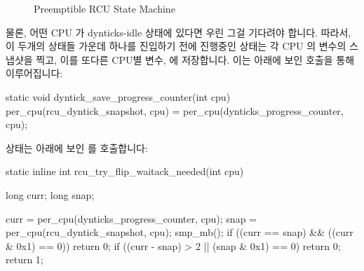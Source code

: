 \fi

\begin{figure}[tb]
\centering
{}
\caption{Preemptible RCU State Machine}
\label{fig:formal:Preemptible RCU State Machine}
\end{figure}

물론, 어떤 CPU 가 dynticks-idle 상태에 있다면 우린 그걸 기다려야 합니다.
따라서, 이 두개의 상태들 가운데 하나를 진입하기 전에 진행중인 상태는 각 CPU 의
 변수의 스냅샷을 찍고, 이를 또다른 CPU별 변수,
 에 저장합니다.
이는 아래에 보인  호출을 통해 이루어집니다:

\iffalse

Of course, if a given CPU is in dynticks-idle state, we shouldn't
wait for it.
Therefore, just before entering one of these two states,
the preceding state takes a snapshot of each CPU's
\co{dynticks_progress_counter} variable, placing the
snapshot in another per-CPU variable,
\co{rcu_dyntick_snapshot}.
This is accomplished by invoking
\co{dyntick_save_progress_counter()}, shown below:

\fi

\begin{VerbatimN}
static void dyntick_save_progress_counter(int cpu)
{
	per_cpu(rcu_dyntick_snapshot, cpu) =
		per_cpu(dynticks_progress_counter, cpu);
}
\end{VerbatimN}

 상태는 아래에 보인
 를 호출합니다:

\iffalse

The \co{rcu_try_flip_waitack_state} state invokes
\co{rcu_try_flip_waitack_needed()}, shown below:

\fi

\begin{fcvlabel}
\begin{VerbatimN}[samepage=true,commandchars=\\\[\]]
static inline int
rcu_try_flip_waitack_needed(int cpu)
{
	long curr;
	long snap;

	curr = per_cpu(dynticks_progress_counter, cpu); \lnlbl[curr]
	snap = per_cpu(rcu_dyntick_snapshot, cpu); \lnlbl[snap]
	smp_mb();				\lnlbl[mb]
	if ((curr == snap) && ((curr & 0x1) == 0)) 
		return 0;			\lnlbl[ret_0_r]
	if ((curr - snap) > 2 || (snap & 0x1) == 0) 
		return 0;			\lnlbl[ret_0_i]
	return 1;				\lnlbl[ret_1]
}
\end{VerbatimN}
\end{fcvlabel}

